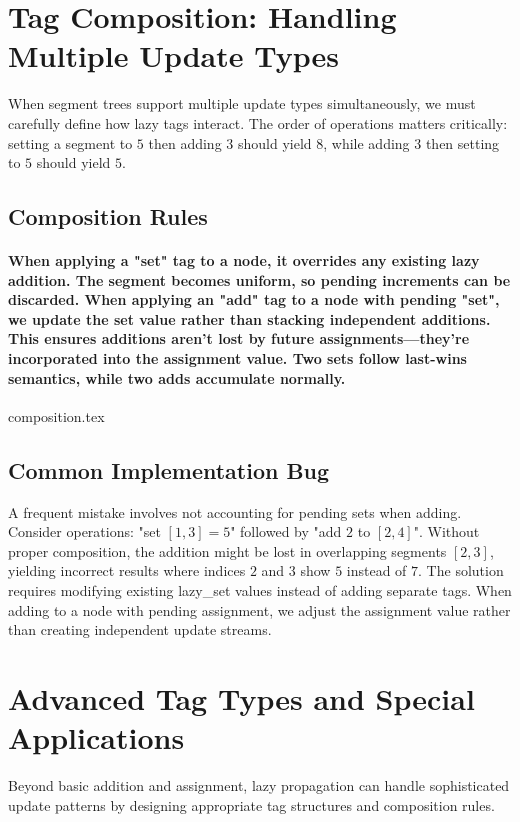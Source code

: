 \section{Tag Composition: Handling Multiple Update Types}
\label{sec:combining_tags}
When segment trees support multiple update types simultaneously, we must carefully define how lazy tags interact. The order of operations matters critically: setting a segment to $5$ then adding $3$ should yield $8$, while adding $3$ then setting to $5$ should yield $5$.
\subsection{Composition Rules}
\paragraph{When applying a "set" tag to a node, it overrides any existing lazy addition. The segment becomes uniform, so pending increments can be discarded. When applying an "add" tag to a node with pending "set", we update the set value rather than stacking independent additions.
This ensures additions aren't lost by future assignments—they're incorporated into the assignment value. Two sets follow last-wins semantics, while two adds accumulate normally.}
\begin{algorithm}[H]
{composition.tex}
\end{algorithm}

\subsection{Common Implementation Bug}
A frequent mistake involves not accounting for pending sets when adding. Consider operations: "set $[1,3] = 5$" followed by "add $2$ to $[2,4]$". Without proper composition, the addition might be lost in overlapping segments $[2,3]$, yielding incorrect results where indices $2$ and $3$ show $5$ instead of $7$.
The solution requires modifying existing lazy\_set values instead of adding separate tags. When adding to a node with pending assignment, we adjust the assignment value rather than creating independent update streams.
\section{Advanced Tag Types and Special Applications}
\label{sec:special_tags}
Beyond basic addition and assignment, lazy propagation can handle sophisticated update patterns by designing appropriate tag structures and composition rules.
